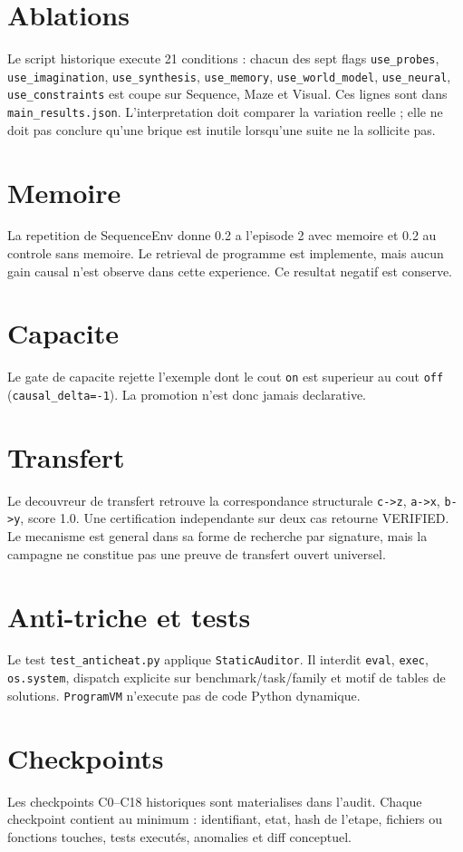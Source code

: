 \documentclass[11pt,a4paper]{article}
\begin{document}
\section{Ablations}
Le script historique execute 21 conditions : chacun des sept flags \texttt{use\_probes}, \texttt{use\_imagination}, \texttt{use\_synthesis}, \texttt{use\_memory}, \texttt{use\_world\_model}, \texttt{use\_neural}, \texttt{use\_constraints} est coupe sur Sequence, Maze et Visual. Ces lignes sont dans \texttt{main\_results.json}. L'interpretation doit comparer la variation reelle ; elle ne doit pas conclure qu'une brique est inutile lorsqu'une suite ne la sollicite pas.

\section{Memoire}
La repetition de SequenceEnv donne 0.2 a l'episode 2 avec memoire et 0.2 au controle sans memoire. Le retrieval de programme est implemente, mais aucun gain causal n'est observe dans cette experience. Ce resultat negatif est conserve.

\section{Capacite}
Le gate de capacite rejette l'exemple dont le cout \texttt{on} est superieur au cout \texttt{off} (\texttt{causal\_delta=-1}). La promotion n'est donc jamais declarative.

\section{Transfert}
Le decouvreur de transfert retrouve la correspondance structurale \texttt{c->z}, \texttt{a->x}, \texttt{b->y}, score 1.0. Une certification independante sur deux cas retourne VERIFIED. Le mecanisme est general dans sa forme de recherche par signature, mais la campagne ne constitue pas une preuve de transfert ouvert universel.

\section{Anti-triche et tests}
Le test \texttt{test\_anticheat.py} applique \texttt{StaticAuditor}. Il interdit \texttt{eval}, \texttt{exec}, \texttt{os.system}, dispatch explicite sur benchmark/task/family et motif de tables de solutions. \texttt{ProgramVM} n'execute pas de code Python dynamique.

\section{Checkpoints}
Les checkpoints C0--C18 historiques sont materialises dans l'audit. Chaque checkpoint contient au minimum : identifiant, etat, hash de l'etape, fichiers ou fonctions touches, tests executés, anomalies et diff conceptuel.
\end{document}
